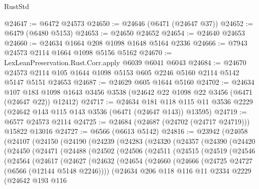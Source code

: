 \begin{lexlean}{RustStd}
\begin{coremodule}
@24647 := @6472 @24573
@24650 := @24646 (@6471 (@24647 @37))
@24652 := @6479 (@6480 @5153)
@24653 := @24650 @24652
@24654 := @24640 @24653
@24660 := @24634 @1664 @208 @1098 @1648 @5164 @2336
@24666 := @7943 @24573 @2114 @1664 @1098 @5156 @5162
@24670 := LexLeanPreservation.Rust.Corr.apply @6039 @6041 @6043
@24684 := @24670 @24573 @2114 @105 @1644 @1098 @5153 @605 @2246 @5160 @2114 @5142 @5147 @5151 @24653
@24687 := @24629 @605 @1644 @5160
@24702 := @24634
    @107
    @183
    @1098
    @1643
    @3456
    @3538
    (@24642 @22 @1098 @22 @3456 (@6471 (@24647 @22)) @12412)
@24717 := @24634
    @181
    @118
    @115
    @11
    @3536
    @2229
    (@24642 @143 @115 @143 @3536 (@6471 (@24647 @143)) @13595)
@24719 := @6577 @24573 @2114
@24725 := @24684 (@24687 (@24702 (@24717 @24719))) @15822 @13016
@24727 := @6566 (@6613 @5142)
@24816 := @23942
    (@24058
      (@24107
        (@24150
          (@24190
            (@24239
              (@24283
                (@24320
                  (@24357
                    (@24390
                      (@24420
                        (@24450
                          (@24471
                            (@24488
                              (@24502
                                (@24506
                                  (@24511
                                    (@24515
                                      (@24519
                                        (@24546
                                          (@24564
                                            (@24617
                                              (@24627
                                                (@24632
                                                  (@24654
                                                    (@24660
                                                      (@24666
                                                        (@24725
                                                          @24727
                                                          (@6566 (@12144 @5148 @2246))))
                                                      (@24634
                                                        @206
                                                        @118
                                                        @116
                                                        @11
                                                        @2334
                                                        @2229
                                                        (@24642
                                                          @193
                                                          @116

\end{coremodule}
\end{lexlean}
